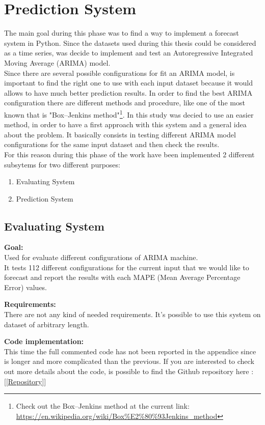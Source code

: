 
\chapter{Prediction System}
The main goal during this phase was to find a way to implement a forecast system in Python.
Since the datasets used during this thesis could be considered as a time series, was decide to implement and test an Autoregressive Integrated Moving Average (ARIMA) model. \\
Since there are several possible configurations for fit an ARIMA model, is important to find the right one to use with each input dataset because it would allows to have much better prediction results.
In order to find the best ARIMA configuration there are different methods and procedure, like one of the most known that is "Box–Jenkins method"\footnote{Check out the Box–Jenkins method at the current link: \\ \url{https://en.wikipedia.org/wiki/Box\%E2\%80\%93Jenkins_method}}. In this study was decied to use an easier method, in order to have a first approach with this system and a general idea about the problem. It basically consists in testing different ARIMA model configurations for the same input dataset and then check the results.\\
For this reason during this phase of the work have been implemented 2 different subsytems for two different purposes:
\begin{enumerate}
\item Evaluating System
\item Prediction System
\end{enumerate}

\newpage
\section{Evaluating System}
\textbf{Goal:}\\ 
Used for evaluate different configurations of ARIMA machine. \\ It tests 112 different configurations for the current input that we would like to forecast and report the results with each MAPE (Mean Average Percentage Error) values.

\textbf{Requirements:}\\
There are not any kind of needed requirements. It's possible to use this system on dataset of arbitrary length.

\textbf{Code implementation:}\\
This time the full commented code has not been reported in the appendice since is longer and more complicated than the previous. If you are interested to check out more details about the code, is possible to find the Github repository here : [\ref{Repository}]

